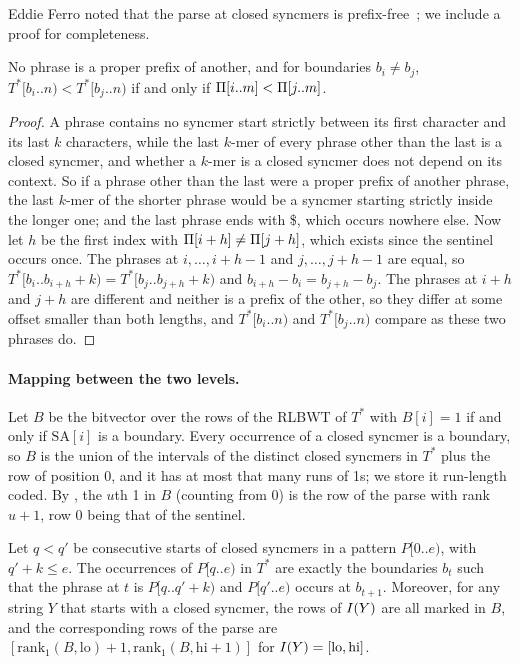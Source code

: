 Eddie Ferro noted that the parse at closed syncmers is
prefix-free~\cite{FerroPC}; we include a proof for completeness.

\begin{lemma}
\label{lem:order}
No phrase is a proper prefix of another, and for boundaries $b_i \ne
b_j$, $T^*[b_i .. n) < T^*[b_j .. n)$ if and only if $\Pi[i .. m] <
\Pi[j .. m]$.
\end{lemma}

\begin{proof}
A phrase contains no syncmer start strictly between its first character
and its last $k$ characters, while the last $k$-mer of every phrase
other than the last is a closed syncmer, and whether a $k$-mer is a
closed syncmer does not depend on its context. So if a phrase other than the last were a proper prefix of another
phrase, the last $k$-mer of the shorter phrase would be a syncmer
starting strictly inside the longer one;
and the last phrase ends with \$, which occurs nowhere else. Now let $h$
be the first index with $\Pi[i + h] \ne \Pi[j + h]$, which exists since
the sentinel occurs once. The phrases at $i, \ldots, i + h - 1$ and $j,
\ldots, j + h - 1$ are equal, so $T^*[b_i .. b_{i+h} + k) = T^*[b_j ..
b_{j+h} + k)$ and $b_{i+h} - b_i = b_{j+h} - b_j$. The phrases at $i +
h$ and $j + h$ are different and neither is a prefix of the other, so
they differ at some offset smaller than both lengths, and $T^*[b_i..n)$
and $T^*[b_j..n)$ compare as these two phrases do.
\end{proof}

\paragraph*{Mapping between the two levels.}
Let $B$ be the bitvector over the rows of the RLBWT of $T^*$ with $B[i] =
1$ if and only if $\mathrm{SA}[i]$ is a boundary. Every occurrence of a
closed syncmer is a boundary, so $B$ is the union of the intervals of
the distinct closed syncmers in $T^*$ plus the row of position $0$, and it
has at most that many runs of 1s; we store it run-length coded. By
, the $u$th 1 in $B$ (counting from $0$) is the row of
the parse with rank $u + 1$, row $0$ being that of the sentinel.

\begin{lemma}
\label{lem:bounce}
Let $q < q'$ be consecutive starts of closed syncmers in a pattern
$P[0..e)$, with $q' + k \le e$. The occurrences of $P[q..e)$ in $T^*$ are
exactly the boundaries $b_t$ such that the phrase at $t$ is $P[q .. q'
+ k)$ and $P[q'..e)$ occurs at $b_{t+1}$. Moreover, for any string $Y$
that starts with a closed syncmer, the rows of $I(Y)$ are all
marked in $B$, and the corresponding rows of the parse are
$[\mathrm{rank}_1(B, \mathrm{lo}) + 1, \mathrm{rank}_1(B, \mathrm{hi} +
1)]$ for $I(Y) = [\mathrm{lo}, \mathrm{hi}]$.
\end{lemma}

